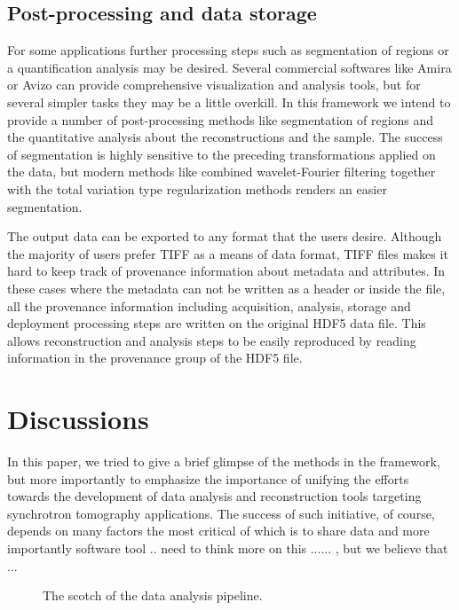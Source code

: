 \documentclass[pdf]{iucr}              %
\begin{document}
\subsection{Post-processing and data storage}

For some applications further processing steps such as segmentation of regions or a quantification analysis may be desired. Several commercial softwares like Amira or Avizo \cite{amira_avizo} can provide comprehensive visualization and analysis tools, but for several simpler tasks they may be a little overkill. In this framework we intend to provide a number of post-processing methods like segmentation of regions and  the quantitative analysis about the reconstructions and the sample. The success of segmentation is highly sensitive to the preceding transformations applied on the data, but modern methods like combined wavelet-Fourier filtering together with the total variation type regularization methods renders an easier segmentation. 

The output data can be exported to any format that the users desire. Although the majority of users prefer TIFF as a means of data format, TIFF files makes it hard to keep track of provenance information about metadata and attributes. In these cases where the metadata can not be written as a header or inside the file, all the provenance information including acquisition, analysis, storage and deployment processing steps are written on the original HDF5 data file. This allows reconstruction and analysis steps to be easily reproduced by reading information in the provenance group of the HDF5 file. 

\section{Discussions}

In this paper, we tried to give a brief glimpse of the methods in the framework, but more importantly to emphasize the importance of unifying the efforts towards the development of data analysis and reconstruction tools targeting synchrotron tomography applications. The success of such initiative, of course, depends on many factors the most critical of which is to share data and more importantly software tool .. need to think more on this ...... , but we believe that ...


\onecolumn
\begin{figure}
\centering
\caption{The scotch of the data analysis pipeline.}
\label{fig:ProcessSegmentation}
\end{figure}
\twocolumn
\end{document}
